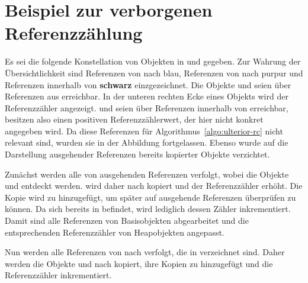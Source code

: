 \chapter{Beispiel zur verborgenen Referenzzählung}
\label{cha:ulterior-example}

Es sei die folgende Konstellation von Objekten in \Nursery und \Mature gegeben.
Zur Wahrung der Übersichtlichkeit sind Referenzen von \Nursery nach \Mature \textcolor{ctcolormain}{blau}, Referenzen von \Mature nach \Nursery \textcolor{ctcoloraccessory}{purpur} und Referenzen innerhalb von \Nursery \textbf{schwarz} einzgezeichnet.
Die Objekte  und  seien über Referenzen aus \Roots erreichbar.
In der unteren rechten Ecke eines Objekts wird der Referenzzähler angezeigt.
 und  seien über Referenzen innerhalb von \Mature erreichbar, besitzen also einen positiven Referenzzählerwert, der hier nicht konkret angegeben wird.
Da diese Referenzen für Algorithmus~\ref{algo:ulterior-rc} nicht relevant sind, wurden sie in der Abbildung fortgelassen.
Ebenso wurde auf die Darstellung ausgehender Referenzen bereits kopierter Objekte verzichtet.

\begin{center}
	
\end{center}

Zunächst werden alle von \Roots ausgehenden Referenzen verfolgt, wobei die Objekte  und  entdeckt werden.
 wird daher nach \Mature kopiert und der Referenzzähler erhöht.
Die Kopie  wird zu  hinzugefügt, um später  auf ausgehende Referenzen überprüfen zu können.
Da sich  bereits in \Mature befindet, wird lediglich dessen Zähler inkrementiert.
Damit sind alle Referenzen von Basisobjekten abgearbeitet und die entsprechenden Referenzzähler von Heapobjekten angepasst.

\begin{center}
	
\end{center}

Nun werden alle Referenzen von \Mature nach \Nursery verfolgt, die in  verzeichnet sind.
Daher werden die Objekte  und  nach \Mature kopiert, ihre Kopien zu  hinzugefügt und die Referenzzähler inkrementiert.

\begin{center}
	
	
	
\end{center}

